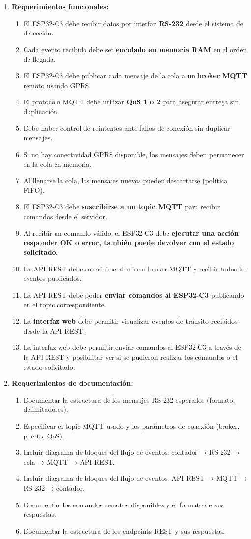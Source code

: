 \documentclass[
11pt, %
]{charter}
\begin{document}
\begin{enumerate}
	\item \textbf{Requerimientos funcionales:}
			\begin{enumerate}
			\item El ESP32-C3 debe recibir datos por interfaz \textbf{RS-232} desde el sistema de detección.
			\item  Cada evento recibido debe ser \textbf{encolado en memoria RAM} en el orden de llegada.
			\item  El ESP32-C3 debe publicar cada mensaje de la cola a un \textbf{broker MQTT} remoto usando GPRS.
			\item  El protocolo MQTT debe utilizar \textbf{QoS 1 o 2} para asegurar entrega sin duplicación.
			\item  Debe haber control de reintentos ante fallos de conexión sin duplicar mensajes.
			\item  Si no hay conectividad GPRS disponible, los mensajes deben permanecer en la cola en memoria.
			\item  Al llenarse la cola, los mensajes nuevos pueden descartarse (política FIFO).
			\item  El ESP32-C3 debe \textbf{suscribirse a un topic MQTT} para recibir comandos desde el servidor.
			\item  Al recibir un comando válido, el ESP32-C3 debe \textbf{ejecutar una acción responder OK o error, también puede devolver con el estado solicitado}.
			\item  La API REST debe suscribirse al mismo broker MQTT y recibir todos los eventos publicados.
			\item  La API REST debe poder \textbf{enviar comandos al ESP32-C3} publicando en el topic correspondiente.
			\item  La \textbf{interfaz web} debe permitir visualizar eventos de tránsito recibidos desde la API REST.
			\item  La interfaz web debe permitir enviar comandos al ESP32-C3 a través de la API REST y posibilitar ver si se pudieron realizar los comandos o el estado solicitado.
		\end{enumerate}
		
	\item \textbf{Requerimientos de documentación:}
		\begin{enumerate}
			\item Documentar la estructura de los mensajes RS-232 esperados (formato, delimitadores).
			\item Especificar el topic MQTT usado y los parámetros de conexión (broker, puerto, QoS).
			\item Incluir diagrama de bloques del flujo de eventos: contador → RS-232 → cola → MQTT → API REST.
			\item Incluir diagrama de bloques del flujo de eventos: API REST → MQTT → RS-232 → contador.
			\item  Documentar los comandos remotos disponibles y el formato de sus respuestas.
			\item Documentar la estructura de los endpoints REST y sus respuestas.
		\end{enumerate}


\end{enumerate}
\end{document}
